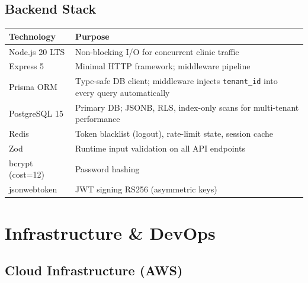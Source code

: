 \documentclass[12pt,a4paper]{report}
\begin{document}
\section{Backend Stack}

\begin{longtable}{L{3.5cm} L{10cm}}
\toprule
\textbf{Technology} & \textbf{Purpose} \\\midrule\endhead\bottomrule\endfoot
Node.js 20 LTS  & Non-blocking I/O for concurrent clinic traffic \\
Express 5       & Minimal HTTP framework; middleware pipeline \\
Prisma ORM      & Type-safe DB client; middleware injects \texttt{tenant\_id} into every query automatically \\
PostgreSQL 15   & Primary DB; JSONB, RLS, index-only scans for multi-tenant performance \\
Redis           & Token blacklist (logout), rate-limit state, session cache \\
Zod             & Runtime input validation on all API endpoints \\
bcrypt (cost=12) & Password hashing \\
jsonwebtoken    & JWT signing RS256 (asymmetric keys) \\
\end{longtable}

\chapter{Infrastructure \& DevOps}

\section{Cloud Infrastructure (AWS)}
\end{document}
